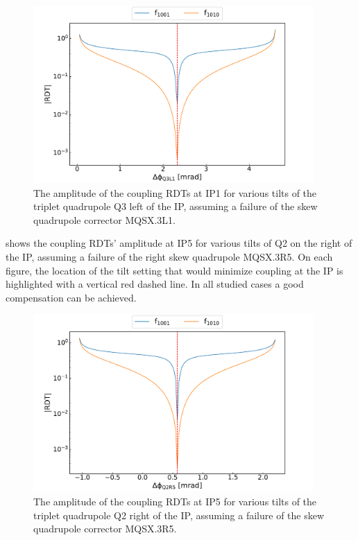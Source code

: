 \begin{figure}[!htb]
    \centering
    \includegraphics*[width=0.95\textwidth]{Figures/IR_Coupling_Correction/ir1_compensate_left_with_q3.pdf}
    \caption{The amplitude of the coupling RDTs at IP\num{1} for various tilts of the triplet quadrupole Q\num{3} left of the IP, assuming a failure of the skew quadrupole corrector MQSX.\num{3}L\num{1}.}
    \label{figure:ir1_compensate_left_with_q3}
\end{figure}

 shows the coupling RDTs' amplitude at IP\num{5} for various tilts of Q\num{2} on the right of the IP, assuming a failure of the right \gls{skew} quadrupole MQSX.\num{3}R\num{5}.
On each figure, the location of the tilt setting that would minimize coupling at the IP is highlighted with a vertical \textcolor{mplr}{red} dashed line.
In all studied cases a good compensation can be achieved.

\begin{figure}[!htb]
    \centering
    \includegraphics*[width=0.95\textwidth]{Figures/IR_Coupling_Correction/ir5_compensate_right_with_q2.pdf}
    \caption{The amplitude of the coupling RDTs at IP\num{5} for various tilts of the triplet quadrupole Q\num{2} right of the IP, assuming a failure of the skew quadrupole corrector MQSX.\num{3}R\num{5}.}
    \label{figure:ir5_compensate_right_with_q2}
\end{figure}

